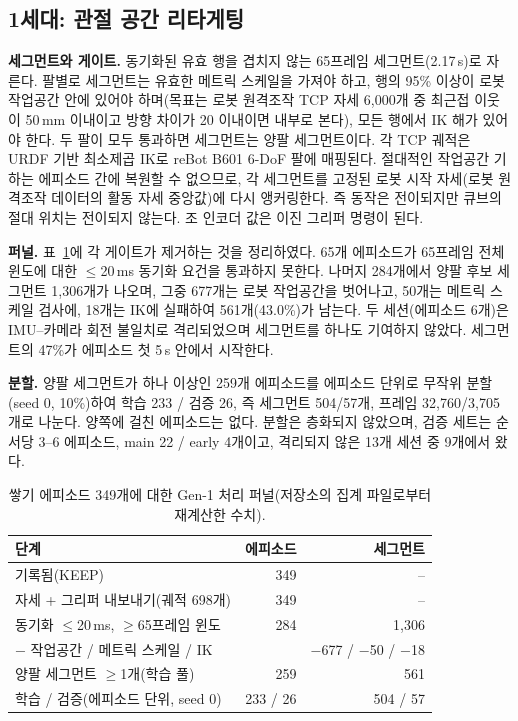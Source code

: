 \documentclass[conference,10pt]{IEEEtran}
\newcommand{\mm}{\,mm\xspace}
\begin{document}
\subsection{1세대: 관절 공간 리타게팅}
\textbf{세그먼트와 게이트.} 동기화된 유효 행을 겹치지 않는 65프레임 세그먼트(2.17\,s)로 자른다. 팔별로 세그먼트는 유효한 메트릭
스케일을 가져야 하고, 행의 95\% 이상이 로봇 작업공간 안에 있어야 하며(목표는 로봇 원격조작 TCP 자세 6{,}000개 중 최근접 이웃이
50\mm{} 이내이고 방향 차이가 20\textdegree{} 이내이면 내부로 본다), 모든 행에서 IK 해가 있어야 한다. 두 팔이 모두 통과하면 세그먼트는
양팔 세그먼트이다. 각 TCP 궤적은 URDF 기반 최소제곱 IK로 reBot B601 6-DoF 팔에 매핑된다. 절대적인 작업공간 기하는 에피소드 간에
복원할 수 없으므로, 각 세그먼트를 고정된 로봇 시작 자세(로봇 원격조작 데이터의 활동 자세 중앙값)에 다시 앵커링한다. 즉 동작은
전이되지만 큐브의 절대 위치는 전이되지 않는다. 조 인코더 값은 이진 그리퍼 명령이 된다.

\textbf{퍼널.} 표~\ref{tab:funnel}에 각 게이트가 제거하는 것을 정리하였다. 65개 에피소드가 65프레임 전체 윈도에 대한 $\le$20\,ms
동기화 요건을 통과하지 못한다. 나머지 284개에서 양팔 후보 세그먼트 1{,}306개가 나오며, 그중 677개는 로봇 작업공간을 벗어나고, 50개는
메트릭 스케일 검사에, 18개는 IK에 실패하여 561개(43.0\%)가 남는다. 두 세션(에피소드 6개)은 IMU--카메라 회전 불일치로 격리되었으며
세그먼트를 하나도 기여하지 않았다. 세그먼트의 47\%가 에피소드 첫 5\,s 안에서 시작한다.

\textbf{분할.} 양팔 세그먼트가 하나 이상인 259개 에피소드를 에피소드 단위로 무작위 분할(seed 0, 10\%)하여 학습 233 / 검증 26, 즉
세그먼트 504/57개, 프레임 32{,}760/3{,}705개로 나눈다. 양쪽에 걸친 에피소드는 없다. 분할은 층화되지 않았으며, 검증 세트는 순서당 3--6
에피소드, main 22 / early 4개이고, 격리되지 않은 13개 세션 중 9개에서 왔다.

\begin{table}[t]
\centering\footnotesize
\caption{쌓기 에피소드 349개에 대한 Gen-1 처리 퍼널(저장소의 집계 파일로부터 재계산한 수치).}
\label{tab:funnel}
\setlength{\tabcolsep}{4pt}\begin{tabular}{@{}lrr@{}}
\toprule
단계 & 에피소드 & 세그먼트 \\
\midrule
기록됨(KEEP) & 349 & -- \\
자세 + 그리퍼 내보내기(궤적 698개) & 349 & -- \\
동기화 $\le$20\,ms, $\ge$65프레임 윈도 & 284 & 1{,}306 \\
\quad $-$ 작업공간 / 메트릭 스케일 / IK & & $-$677 / $-$50 / $-$18 \\
양팔 세그먼트 $\ge$1개(학습 풀) & 259 & 561 \\
\quad 학습 / 검증(에피소드 단위, seed 0) & 233 / 26 & 504 / 57 \\
\bottomrule
\end{tabular}
\end{table}
\end{document}
